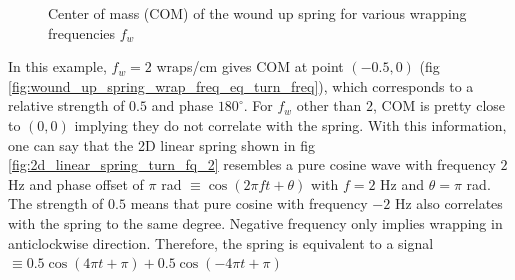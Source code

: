 \documentclass[11pt, a4paper]{article}
\begin{document}
	\begin{figure}[H]
		\centering
		\hfill
		
		\caption{Center of mass (COM) of the wound up spring for various wrapping frequencies $f_{w}$}
		\label{fig:wound_up_spring_com_plots}
	\end{figure}

	In this example, $f_{w} = 2$ wraps/cm gives COM at point $(-0.5, 0)$ (fig \ref{fig:wound_up_spring_wrap_freq_eq_turn_freq}), which corresponds to a relative strength of $0.5$ and phase $180^{\circ}$. For $f_{w}$ other than $2$, COM is pretty close to $(0, 0)$ implying they do not correlate with the spring. With this information, one can say that the 2D linear spring shown in fig \ref{fig:2d_linear_spring_turn_fq_2} resembles a pure cosine wave with frequency $2$ Hz and phase offset of $\pi$ rad $\equiv \cos(2\pi ft + \theta)$ with $f = 2$ Hz and $\theta = \pi$ rad. The strength of $0.5$ means that pure cosine with frequency $-2$ Hz also correlates with the spring to the same degree. Negative frequency only implies wrapping in anticlockwise direction. Therefore, the spring is equivalent to a signal $\equiv 0.5\cos(4\pi t + \pi) + 0.5\cos(-4\pi t + \pi)$
\end{document}
